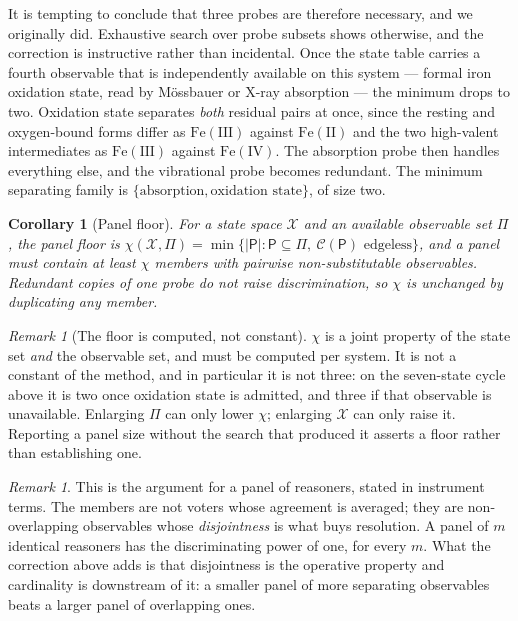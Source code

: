 \documentclass[11pt,twocolumn,a4paper]{article}
\theoremstyle{plain}
\newtheorem{corollary}[theorem]{Corollary}
\theoremstyle{definition}
\theoremstyle{remark}
\newtheorem{remark}[theorem]{Remark}
\newcommand{\pan}{\mathsf{P}}
\begin{document}
It is tempting to conclude that three probes are therefore necessary, and we
originally did. Exhaustive search over probe subsets shows otherwise, and the
correction is instructive rather than incidental. Once the state table carries a
fourth observable that is independently available on this system --- formal iron
oxidation state, read by M\"ossbauer or X-ray absorption --- the minimum drops to
two. Oxidation state separates \emph{both} residual pairs at once, since the
resting and oxygen-bound forms differ as $\mathrm{Fe(III)}$ against
$\mathrm{Fe(II)}$ and the two high-valent intermediates as $\mathrm{Fe(III)}$
against $\mathrm{Fe(IV)}$. The absorption probe then handles everything else,
and the vibrational probe becomes redundant. The minimum separating family is
$\{\text{absorption},\text{oxidation state}\}$, of size two.

\begin{corollary}[Panel floor]
\label{cor:three}
For a state space $\mathcal{X}$ and an available observable set $\Pi$, the panel
floor is
$\chi(\mathcal{X},\Pi) = \min\{|\pan| : \pan\subseteq\Pi,\ \mathcal{C}(\pan)
\text{ edgeless}\}$,
and a panel must contain at least $\chi$ members with pairwise non-substitutable
observables. Redundant copies of one probe do not raise discrimination, so
$\chi$ is unchanged by duplicating any member.
\end{corollary}

\begin{remark}[The floor is computed, not constant]
\label{rem:floor-computed}
$\chi$ is a joint property of the state set \emph{and} the observable set, and
must be computed per system. It is not a constant of the method, and in
particular it is not three: on the seven-state cycle above it is two once
oxidation state is admitted, and three if that observable is unavailable.
Enlarging $\Pi$ can only lower $\chi$; enlarging $\mathcal{X}$ can only raise it.
Reporting a panel size without the search that produced it asserts a floor rather
than establishing one.
\end{remark}

\begin{remark}
This is the argument for a panel of reasoners, stated in instrument terms. The
members are not voters whose agreement is averaged; they are non-overlapping
observables whose \emph{disjointness} is what buys resolution. A panel of $m$
identical reasoners has the discriminating power of one, for every $m$. What the
correction above adds is that disjointness is the operative property and
cardinality is downstream of it: a smaller panel of more separating observables
beats a larger panel of overlapping ones.
\end{remark}
\end{document}

